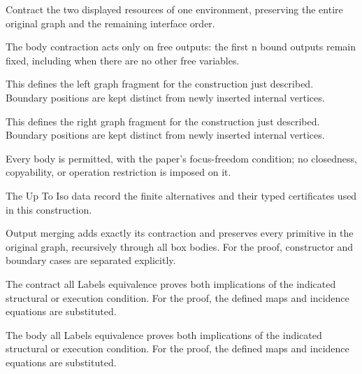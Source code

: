Contract the two displayed resources of one environment, preserving the entire original graph and the remaining interface order.
\par{}

The body contraction acts only on free outputs: the first n bound outputs remain fixed, including when there are no other free variables.
\par{}

This defines the left graph fragment for the construction just described. Boundary positions are kept distinct from newly inserted internal vertices.
\par{}

This defines the right graph fragment for the construction just described. Boundary positions are kept distinct from newly inserted internal vertices.
\par{}

Every body is permitted, with the paper's focus-freedom condition; no closedness, copyability, or operation restriction is imposed on it.
\par{}

The Up To Iso data record the finite alternatives and their typed certificates used in this construction.
\par{}

Output merging adds exactly its contraction and preserves every primitive in the original graph, recursively through all box bodies.
For the proof, constructor and boundary cases are separated explicitly.
\par{}

The contract all Labels equivalence proves both implications of the indicated structural or execution condition.
For the proof, the defined maps and incidence equations are substituted.
\par{}

The body all Labels equivalence proves both implications of the indicated structural or execution condition.
For the proof, the defined maps and incidence equations are substituted.
\par{}

